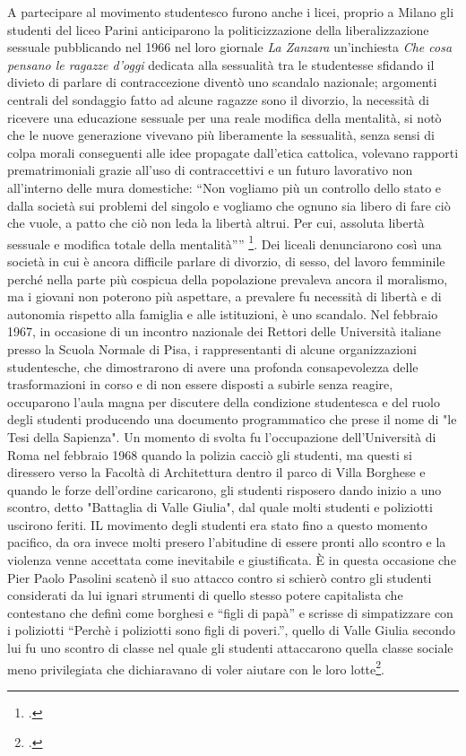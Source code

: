 A partecipare al movimento studentesco furono anche i licei, proprio a Milano gli studenti del liceo Parini anticiparono la politicizzazione della liberalizzazione sessuale pubblicando nel 1966 nel loro giornale \textit{La Zanzara} un'inchiesta \textit{Che cosa pensano le ragazze d’oggi} dedicata alla sessualità tra le studentesse sfidando il divieto di parlare di contraccezione diventò uno scandalo nazionale; argomenti centrali del sondaggio fatto ad alcune ragazze sono il divorzio, la necessità di ricevere una educazione sessuale per una reale modifica della mentalità, si notò che le nuove generazione vivevano più liberamente la sessualità, senza sensi di colpa morali conseguenti alle idee propagate dall'etica cattolica, volevano rapporti prematrimoniali grazie all'uso di contraccettivi e un futuro lavorativo non all'interno delle mura domestiche: \enquote{Non vogliamo più un controllo dello stato e dalla società sui problemi del singolo e vogliamo che ognuno sia libero di fare ciò che vuole, a patto che ciò non leda la libertà altrui. Per cui, assoluta libertà sessuale e modifica totale della mentalità”} \footcite{Zanzara}.
Dei liceali denunciarono così una società in cui è ancora difficile parlare di divorzio, di sesso, del lavoro femminile perché nella parte più cospicua della popolazione prevaleva ancora il moralismo, ma i giovani non poterono più aspettare, a prevalere fu necessità di libertà e di autonomia rispetto alla famiglia e alle istituzioni, è uno scandalo.
Nel febbraio 1967, in occasione di un incontro nazionale dei Rettori delle Università italiane presso la Scuola Normale di Pisa, i rappresentanti di alcune organizzazioni studentesche, che dimostrarono di avere una profonda consapevolezza delle trasformazioni in corso e di non essere disposti a subirle senza reagire, occuparono l'aula magna per discutere della condizione studentesca e del ruolo degli studenti producendo una documento programmatico che prese il nome di "le Tesi della Sapienza".
Un momento di svolta fu l'occupazione dell'Università di Roma nel febbraio 1968 quando la polizia cacciò gli studenti, ma questi si diressero verso la Facoltà di Architettura dentro il parco di Villa Borghese e quando le forze dell'ordine caricarono, gli studenti risposero dando inizio a uno scontro, detto "Battaglia di Valle Giulia", dal quale molti studenti e poliziotti uscirono feriti.
IL movimento degli studenti era stato fino a questo momento pacifico, da ora invece molti presero l'abitudine di essere pronti allo scontro e la violenza venne accettata come inevitabile e giustificata.
È in questa occasione che Pier Paolo Pasolini scatenò il suo attacco contro si schierò contro gli studenti considerati da lui ignari strumenti di quello stesso potere capitalista che contestano che definì come borghesi e \enquote{figli di papà} e scrisse di simpatizzare con i poliziotti \enquote{Perchè i poliziotti sono figli di poveri.}, quello di Valle Giulia secondo lui fu uno scontro di classe nel quale gli studenti attaccarono quella classe sociale meno privilegiata che dichiaravano di voler aiutare con le loro lotte\footcite{ValleGiulia}.
